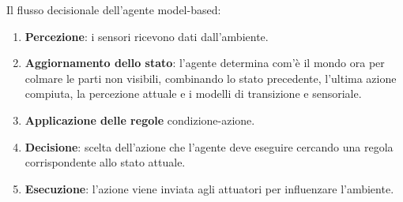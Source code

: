 \begin{center}
\end{center}
























Il flusso decisionale dell'agente model-based:
\begin{enumerate}
    \item \textbf{Percezione}: i sensori ricevono dati dall'ambiente.
    \item \textbf{Aggiornamento dello stato}: l'agente determina com'è il mondo ora per colmare le parti non visibili, combinando lo stato precedente, l'ultima azione compiuta, la percezione attuale e i modelli di transizione e sensoriale.
    \item \textbf{Applicazione delle regole} condizione-azione.
    \item \textbf{Decisione}: scelta dell'azione che l'agente deve eseguire cercando una regola corrispondente allo stato attuale.
    \item \textbf{Esecuzione}: l'azione viene inviata agli attuatori per influenzare l'ambiente.
\end{enumerate}

